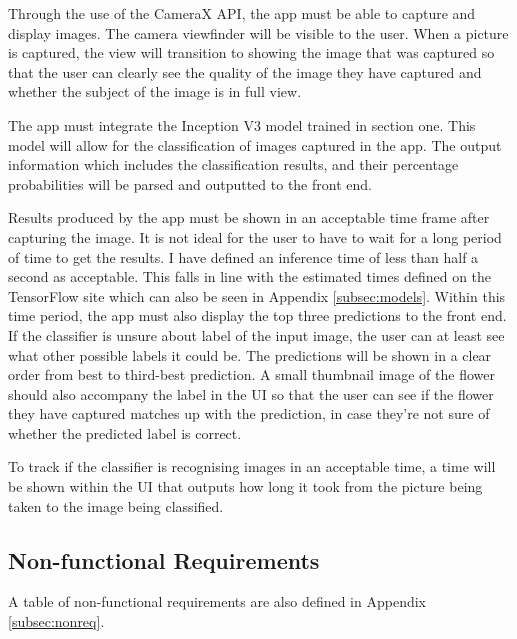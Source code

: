 \documentclass[12pt,a4paper]{report}
\begin{document}
\par

Through the use of the CameraX API, the app must be able to capture and display images. The camera viewfinder will be 
visible to the user. When a picture is captured, the view will transition to showing the image that was captured so 
that the user can clearly see the quality of the image they have captured and whether the subject of the image is in 
full view.

\par

The app must integrate the Inception V3 model trained in section one. This model will allow for the classification of 
images captured in the app. The output information which includes the classification results, and their percentage 
probabilities will be parsed and outputted to the front end.

\par

Results produced by the app must be shown in an acceptable time frame after capturing the image. It is not ideal for 
the user to have to wait for a long period of time to get the results. I have defined an inference time of less than 
half a second as acceptable. This falls in line with the estimated times defined on the TensorFlow site which can also 
be seen in Appendix \ref{subsec:models}. Within this time period, the app must also display the top three predictions 
to the front end. 
If the classifier is unsure about label of the input image, the user can at least see what other possible labels it 
could be. The predictions will be shown in a clear order from best to third-best prediction. A small thumbnail image of 
the flower should also accompany the label in the UI so that the user can see if the flower they have captured matches 
up with the prediction, in case they're not sure of whether the predicted label is correct. 

\par

To track if the classifier is recognising images in an acceptable time, a time will be shown within the UI that outputs 
how long it took from the picture being taken to the image being classified.

\subsection{Non-functional Requirements}

A table of non-functional requirements are also defined in Appendix \ref{subsec:nonreq}.
\end{document}
